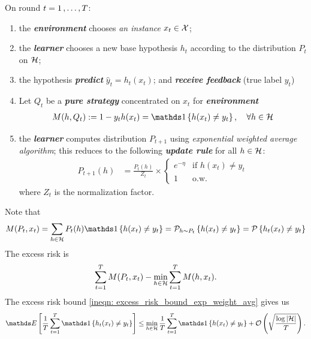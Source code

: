 \documentclass[11pt]{article}
\begin{document}
\begin{itemize}
\begin{remark}
On round $t = 1 \,{,}\ldots{,}\, T$:
\begin{enumerate}
\item the \emph{\textbf{environment}} chooses \emph{an instance} $x_t \in {\mathcal X}$; 
\item the \emph{\textbf{learner}} chooses a new base hypothesis $h_t$ according to the distribution $P_{t}$ on ${\mathcal H}$; 
\item the hypothesis \emph{\textbf{predict}} $\hat{y}_t = h_t(x_t)$; and \emph{\textbf{receive feedback}} (true label $y_t$)
\item Let $Q_t$ be a \emph{\textbf{pure strategy}}  concentrated on $x_t$ for  \emph{\textbf{environment}}
\begin{align*}
M(h, Q_t) := 1 - y_t h(x_t) = \ind{h(x_t) \neq y_t},  \quad \forall h\in \cH
\end{align*}
\item the \emph{\textbf{learner}} computes distribution $P_{t+1}$ using \emph{exponential weighted average algorithm}; this reduces to the following \emph{\textbf{update rule}} for all $h \in {\mathcal H}$:
\begin{align*}
P_{t+1}(h) &= \frac{P_t(h)}{Z_t} \times \left\{ \begin{array}{cc}
e^{-\eta} &\text{if } h(x_t) \neq y_t\\
1 & \text{o.w.}
\end{array}
\right.
\end{align*} where $Z_t$ is the normalization factor.
\end{enumerate} Note that
\begin{align*}
M(P_t, x_t) = \sum_{h \in \cH}P_{t}(h)\ind{h(x_t) \neq y_t} = \cP_{h \sim P_t}\set{h(x_t) \neq y_t} = \cP\set{h_t(x_t) \neq y_t}
\end{align*} The excess risk is
\begin{align}
\sum_{t=1}^{T} M(P_t, x_t) - \min_{h \in {\mathcal H}}\sum_{t=1}^{T}M(h, x_t). \label{eqn: excess_risk_online_prediction}
\end{align}
The excess risk bound \eqref{ineqn: excess_risk_bound_exp_weight_avg} gives us
\begin{align*}
\E{}{\frac{1}{T}\sum_{t=1}^{T}\ind{h_t(x_t) \neq y_t}} \le \min_{h \in \cH}\frac{1}{T}\sum_{t=1}^{T}\ind{h(x_t) \neq y_t} + \cO\paren{\sqrt{\frac{\log \abs{\cH}}{T}}}.
\end{align*} 
\end{remark}




\end{itemize}
\end{document}
